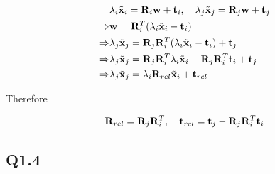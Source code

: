\documentclass[11pt]{article}
\begin{document}
\begin{align}
    & \lambda_i \tilde{\mathbf{x}}_i = \mathbf{R}_i \mathbf{w} + \mathbf{t}_i, \quad
    \lambda_j \tilde{\mathbf{x}}_j = \mathbf{R}_j \mathbf{w} + \mathbf{t}_j
    \nonumber \\ \Rightarrow &
    \mathbf{w} = \mathbf{R}_i ^T (\lambda_i \tilde{\mathbf{x}}_i - \mathbf{t}_i)
    \nonumber \\ \Rightarrow &
    \lambda_j \tilde{\mathbf{x}}_j = \mathbf{R}_j \mathbf{R}_i ^T (\lambda_i \tilde{\mathbf{x}}_i - \mathbf{t}_i) + \mathbf{t}_j
    \nonumber \\ \Rightarrow &
    \lambda_j \tilde{\mathbf{x}}_j = \mathbf{R}_j \mathbf{R}_i ^T \lambda_i \tilde{\mathbf{x}}_i - \mathbf{R}_j \mathbf{R}_i ^T \mathbf{t}_i + \mathbf{t}_j
    \nonumber \\ \Rightarrow &
    \lambda_j \tilde{\mathbf{x}}_j = \lambda_i \mathbf{R}_{rel} \tilde{\mathbf{x}}_i + \mathbf{t}_{rel}
\end{align}

Therefore

\begin{align}
    \mathbf{R}_{rel} = \mathbf{R}_j \mathbf{R}_i ^T, \quad
    \mathbf{t}_{rel} = \mathbf{t}_j - \mathbf{R}_j \mathbf{R}_i ^T \mathbf{t}_i
\end{align}

\newpage

\subsection*{Q1.4}
\end{document}
